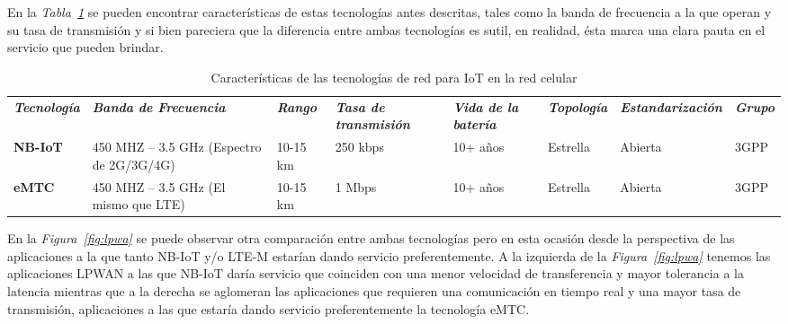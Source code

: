 En la \textit{Tabla~\ref{tab:tecIoT}} se pueden encontrar características de estas tecnologías antes descritas, tales como la banda de frecuencia a la que operan y su tasa de transmisión y si bien pareciera que la diferencia entre ambas tecnologías es sutil, en realidad, ésta marca una clara pauta en el servicio que pueden brindar. \newline

\begin{table}
\caption{Características de las tecnologías de red para IoT en la red celular}
\label{tab:tecIoT}
\centering
\begin{tabular}{|p{0.9in}|p{0.6in}|p{0.4in}|p{0.6in}|p{0.4in}|p{0.8in}|p{1.3in}|p{0.4in}|} \\ \hline \hline
\textbf{\textit{Tecnología}} & \textbf{\textit{Banda de Frecuencia}} & \textbf{\textit{Rango}} & \textbf{\textit{Tasa de transmisión}} & \textbf{\textit{Vida de la batería}} & \textbf{\textit{Topología}} & \textbf{\textit{Estandarización}} & \textbf{\textit{Grupo}} \\ 
\textbf{NB-IoT}  & \footnotesize{ 450 MHZ -- 3.5 GHz (Espectro de 2G/3G/4G) } & \footnotesize{ 10-15 km } & \footnotesize{ 250 kbps } & \footnotesize{ 10+ años } & \footnotesize{ Estrella } & \footnotesize{ Abierta } & \footnotesize{ 3GPP } \\ \hline
\textbf{eMTC}  & \footnotesize{ 450 MHZ -- 3.5 GHz (El mismo que LTE) } & \footnotesize{ 10-15 km } & \footnotesize{ 1 Mbps } & \footnotesize{ 10+ años } & \footnotesize{ Estrella } & \footnotesize{ Abierta } & \footnotesize{ 3GPP } \\
\end{tabular}

\end{table}


En la \textit{Figura~\ref{fig:lpwa}} se puede observar otra comparación entre ambas tecnologías pero en esta ocasión desde la perspectiva de las aplicaciones a la que tanto NB-IoT y/o LTE-M estarían dando servicio preferentemente. A la izquierda de la \textit{Figura~\ref{fig:lpwa}} tenemos las aplicaciones LPWAN a las que NB-IoT daría servicio que coinciden con una menor velocidad de transferencia y mayor tolerancia a la latencia mientras que a la derecha se aglomeran las aplicaciones que requieren una comunicación en tiempo real y una mayor tasa de transmisión, aplicaciones a las que estaría dando servicio preferentemente la tecnología eMTC. \newline

